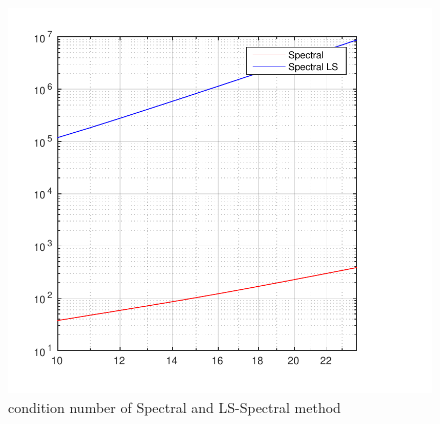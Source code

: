 %
%
\begin{figure}[hl]
	\centering
	\includegraphics{Figures/condSpec-SpecLS.pdf}
	\caption{condition number of Spectral and LS-Spectral method}
	\label{fig:conditionSpec}
\end{figure}
%

